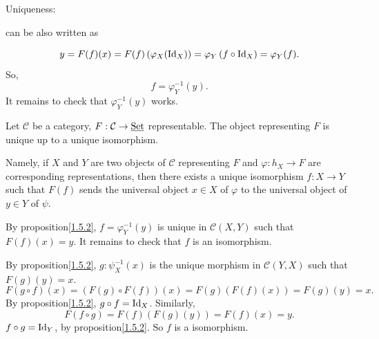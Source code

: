 \begin{proofenv}
    Uniqueness: 
\begin{center}
\end{center}
can be also written as
\begin{center}
\end{center}
$$
y = F(f)(x) = F(f) \left(\varphi_X(\mathrm{Id}_X)\right) =\varphi_Y\left(f\circ\mathrm{Id}_X\right) = \varphi_Y(f).
$$
So, $$f = \varphi_Y^{-1}(y).$$
It remains to check that $\varphi^{-1}_Y(y)$ works.
\end{proofenv}
\begin{corollaryenv}
    Let $\mathcal{C}$ be a category, $F:\mathcal{C}\rightarrow \underline{\mathrm{Set}}$ representable.
    The object representing $F$ is unique up to a unique isomorphism.
    
    \quad Namely, if $X$ and $Y$ are two objects of $\mathcal{C}$ representing $F$ and $\varphi:h_X\rightarrow F$ are corresponding representations, then there exists a unique isomorphism $f:X\rightarrow Y$ such that $F(f)$ sends the universal object $x\in X$ of $\varphi$ to the universal object of $y\in Y$ of $\psi$.
\end{corollaryenv}
\begin{proofenv}
    By proposition\ref{1.5.2}, $f = \varphi_Y^{-1}(y)$ is unique in $\mathcal{C}(X,Y)$ such that $F(f)(x) = y$. It remains to check that $f$ is an isomorphism. 
    
    \quad By proposition\ref{1.5.2}, $g:\psi^{-1}_{X}(x)$ is the unique morphism in $\mathcal{C}(Y,X)$ such that $F(g)(y) = x$.
    $$
    F\left(g\circ f\right)(x) = \left(F(g)\circ F(f)\right)(x) = F(g)\left(F(f)(x)\right) = F(g)(y) = x.
    $$
    By proposition\ref{1.5.2}, $g\circ f = \mathrm{Id}_X$. Similarly, 
    $$
    F\left(f\circ g\right) = F(f)\left(F(g)(y)\right) = F(f)(x) = y.
    $$
    $f\circ g = \mathrm{Id}_Y$, by proposition\ref{1.5.2}. So $f$ is a isomorphism.
\end{proofenv}
